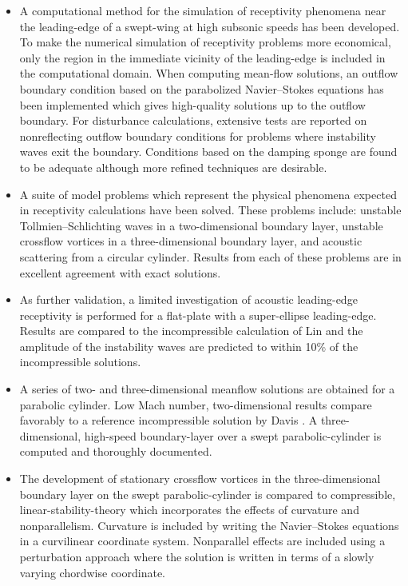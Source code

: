 \begin{itemize}

\item A computational method for the simulation of receptivity phenomena near
the leading-edge of a swept-wing at high subsonic speeds has been developed.
To make the numerical simulation of receptivity problems more economical, only
the region in the immediate vicinity of the leading-edge is included in the
computational domain.  When computing mean-flow solutions, an outflow boundary
condition based on the parabolized Navier--Stokes equations has been
implemented which gives high-quality solutions up to the outflow boundary.
For disturbance calculations, extensive tests are reported on nonreflecting
outflow boundary conditions for problems where instability waves exit the
boundary.  Conditions based on the damping sponge \cite{IsOr:81} are found to
be adequate although more refined techniques are desirable.

\item A suite of model problems which represent the physical phenomena
expected in receptivity calculations have been solved.  These problems
include: unstable Tollmien--Schlichting waves in a two-dimensional boundary
layer, unstable crossflow vortices in a three-dimensional boundary layer, and
acoustic scattering from a circular cylinder.  Results from each of these
problems are in excellent agreement with exact solutions.

\item As further validation, a limited investigation of acoustic leading-edge
receptivity is performed for a flat-plate with a super-ellipse
leading-edge.  Results are compared to the incompressible calculation of Lin
\etal \cite{LiReSa:90} and the amplitude of the instability waves are
predicted to within 10\% of the incompressible solutions.

\item A series of two- and three-dimensional meanflow solutions are obtained
for a parabolic cylinder.  Low Mach number, two-dimensional results compare
favorably to a reference incompressible solution by Davis \cite{Davis:72}.  A
three-dimensional, high-speed boundary-layer over a swept parabolic-cylinder
is computed and thoroughly documented.

\item The development of stationary crossflow vortices in the
three-dimensional \linebreak boundary layer on the swept parabolic-cylinder is
compared to compressible, linear-stability-theory which incorporates the
effects of curvature and nonparallelism.  Curvature is included by writing the
Navier--Stokes equations in a curvilinear coordinate system.
Nonparallel effects are included using a perturbation approach where the
solution is written in terms of a slowly varying chordwise coordinate.


\end{itemize}
